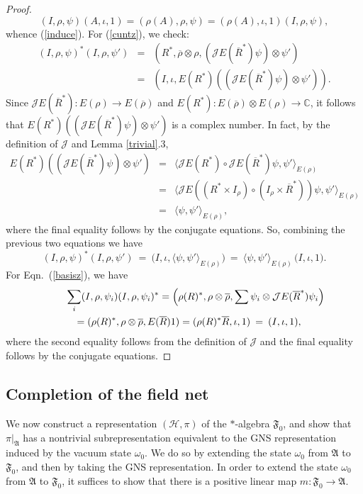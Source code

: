 \documentclass[12pt]{article}
\newcommand{\alg}[1]{\mathfrak{#1}}
\theoremstyle{definition}
\theoremstyle{definition}
\theoremstyle{remark}
\def\2#1{{\mathcal #1}}
\def\7#1{{\mathbb #1}}
\def\ol#1{{\overline #1}}
\def\om{\omega} \def\Om{\Omega} \def\dd{\partial} \def\D{\Delta}
\begin{document}
\begin{proof} 
$$   (I,\rho ,\psi )(A,\iota ,1)=(\rho (A),\rho ,\psi )=(\rho (A),\iota ,1)(I,\rho ,\psi ) ,$$ whence
(\ref{induce}).  For (\ref{cuntz}), we check:
\begin{eqnarray*} (I,\rho ,\psi )^*(I,\rho ,\psi ') &=& (R^*,\ol\rho \otimes \rho ,(\2JE(\ol R^*)\psi )\otimes \psi ') \\
  &=& (I,\iota, E(R^*)((\2JE(\ol R^*)\psi )\otimes \psi ')) .\end{eqnarray*} Since
$\2JE(\ol R^*):E(\rho )\to E(\ol \rho)$ and $E(R^*):E(\ol\rho )\otimes E(\rho )\to
\7C$, it follows that $E(R^*)((\2JE(\ol R^*)\psi )\otimes \psi ')$ is a complex
number.  In fact, by the definition of $\2J$ and Lemma \ref{trivial}.3,
\begin{eqnarray*} E(R^*)((\2JE(\ol R^*)\psi )\otimes \psi ') &=& \bigl\langle
  \2JE(R^*)\circ \2JE(\ol R^*)\psi ,\psi
  '\bigr\rangle _{E(\rho )} \\
  &=& \bigl\langle \2JE((R^*\times I_\rho )\circ (I_\rho \times \ol R^*))\psi ,\psi
  '\bigr\rangle _{E(\rho )} \\
  & =& \bigl\langle \psi ,\psi '\bigr\rangle _{E(\rho )} ,\end{eqnarray*} where the
final equality follows by the conjugate equations.  So, combining the previous two
equations we have
$$ (I,\rho ,\psi )^*(I,\rho ,\psi ') \: = \: \bigl( I,\iota ,\langle \psi ,\psi
'\rangle _{E(\rho )}) \: = \: \langle \psi ,\psi '\rangle _{E(\rho )} \,\bigl(
I,\iota ,1\bigr) .$$ For Eqn.\ (\ref{basisz}), we have
\begin{eqnarray*} \lefteqn{ \sum _i(I,\rho ,\psi _i )(I,\rho ,\psi _i)^* = \left(
      \rho (R)^*,\rho \otimes \ol\rho ,\sum
      \psi _i\otimes \2JE(\ol R^*)\psi _i \right) } \\
  &&= (\rho (R)^*,\rho\otimes \ol\rho ,E(\ol R)1 ) = (\rho (R)^*\ol R,\iota, 1) \:
  =\: (I,\iota ,1) ,\end{eqnarray*} where the second equality follows from the
definition of $\2J$ and the final equality follows by the conjugate equations.
\end{proof}



\subsection{Completion of the field net}

We now construct a representation $(\2H ,\pi )$ of the
$*$-algebra $\alg{F}_0 $, and show that $\pi
|_{\alg{A}}$ has a nontrivial subrepresentation
equivalent to the GNS representation induced by the
vacuum state $\om _0$.  We do so by extending the state
$\om _0$ from $\alg{A}$ to $\alg{F}_0 $, and then by
taking the GNS representation.  In order to extend the
state $\om _0$ from $\alg{A}$ to $\alg{F}_0 $, it
suffices to show that there is a positive linear map
$m:\alg{F}_0 \to \alg{A}$.
\end{document}
